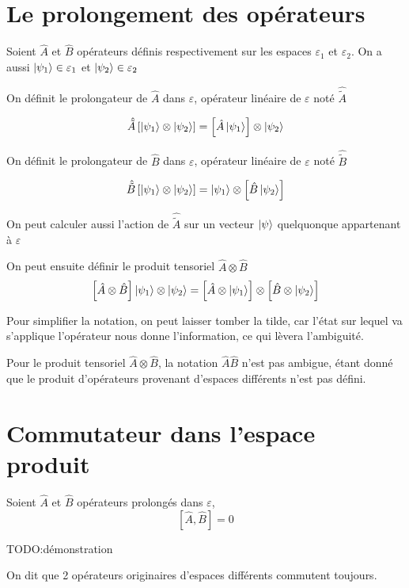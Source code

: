 \section{Le prolongement des opérateurs}

Soient $\hat{A}$ et $\hat{B}$ opérateurs définis respectivement sur les espaces $\varepsilon_1$ et $\varepsilon_2$. On a aussi $\ket{\psi_1}\in\varepsilon_1$ et $\ket{\psi_2}\in\varepsilon_2$

On définit le prolongateur de $\hat{A}$ dans $\varepsilon$, opérateur linéaire de $\varepsilon$ noté $\hat{\tilde{A}}$

$$\hat{\tilde{A}} \left[ \ket{\psi_1} \otimes \ket{\psi_2} \right] = \left[\hat{A}\ket{\psi_1}\right]\otimes\ket{\psi_2}$$

On définit le prolongateur de $\hat{B}$ dans $\varepsilon$, opérateur linéaire de $\varepsilon$ noté $\hat{\tilde{B}}$

$$\hat{\tilde{B}} \left[ \ket{\psi_1} \otimes \ket{\psi_2} \right] = \ket{\psi_1} \otimes \left[\hat{B}\ket{\psi_2}\right]$$

On peut calculer aussi l'action de $\hat{\tilde{A}}$ sur un vecteur $\ket{\psi}$ quelquonque appartenant à $\varepsilon$

On peut ensuite définir le produit tensoriel $\hat{A}\otimes\hat{B}$
$$ \left[ \hat{A}\otimes\hat{B} \right]\ket{\psi_1}\otimes\ket{\psi_2} = \left[\hat{A}\otimes\ket{\psi_1}\right]\otimes\left[\hat{B}\otimes\ket{\psi_2}\right]$$

Pour simplifier la notation, on peut laisser tomber la tilde, car l'état sur lequel va s'applique l'opérateur nous donne l'information, ce qui lèvera l'ambiguité.

Pour le produit tensoriel $\hat{A}\otimes\hat{B}$, la notation $\hat{A}\hat{B}$ n'est pas ambigue, étant donné que le produit d'opérateurs provenant d'espaces différents n'est pas défini.

\section{Commutateur dans l'espace produit}

Soient $\hat{A}$ et $\hat{B}$ opérateurs prolongés dans $\varepsilon$,
$$ \left[\hat{A},\hat{B}\right] = 0 $$

TODO:démonstration

On dit que 2 opérateurs originaires d'espaces différents commutent toujours.